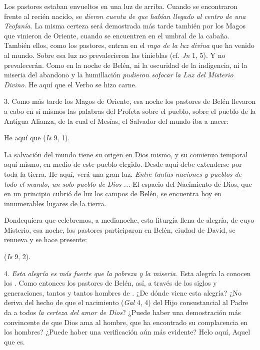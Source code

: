 \begin{body}
\begin{body}
		Los pastores estaban envueltos en una luz de arriba. Cuando se encontraron frente al recién nacido, se \emph{dieron cuenta de que habían llegado al centro de una Teofanía}. La misma certeza será demostrada más tarde también por los Magos que vinieron de Oriente, cuando se encuentren en el umbral de la cabaña. También ellos, como los pastores, entran en el \emph{rayo de la luz divina} que ha venido al mundo. Sobre esa luz no prevalecieron las tinieblas (cf. \emph{Jn} 1, 5). Y no prevalecerán. Como en la noche de Belén, ni la oscuridad de la indigencia, ni la miseria del abandono y la humillación \emph{pudieron sofocar la Luz del Misterio Divino}. He aquí que el Verbo se hizo carne.
		
		3. Como más tarde los Magos de Oriente, esa noche los pastores de Belén llevaron a cabo en sí mismos las palabras del Profeta sobre el pueblo, sobre el pueblo de la Antigua Alianza, de la cual el Mesías, el Salvador del mundo iba a nacer:
		
		He aquí que  (\emph{Is} 9, 1).
		
		La salvación del mundo tiene su origen en Dios mismo, y su comienzo temporal aquí mismo, en medio de este pueblo elegido. Desde aquí debe extenderse por toda la tierra. He aquí,  verá una gran luz. \emph{Entre tantas naciones y pueblos de todo el mundo, un solo pueblo de Dios ...} El espacio del Nacimiento de Dios, que en un principio cubrió de luz los campos de Belén, se encuentra hoy en innumerables lugares de la tierra.
		
		Dondequiera que celebremos, a medianoche, esta liturgia llena de alegría, de cuyo Misterio, esa noche, los pastores participaron en Belén, ciudad de David, se renueva y se hace presente:
		
		 (\emph{Is} 9, 2).
		
		4. \emph{Esta alegría es más fuerte que la pobreza y la miseria.} Esta alegría la conocen los . Como entonces los pastores de Belén, así, a través de los siglos y generaciones, tantos y tantos hombres de . ¿De dónde viene esta alegría? ¿No deriva del hecho de que el nacimiento  (\emph{Gal} 4, 4) del Hijo consustancial al Padre da a todos \emph{la certeza del amor de Dios}? ¿Puede haber una demostración más convincente de que Dios ama al hombre, que ha encontrado su complacencia en los hombres? ¿Puede haber una verificación aún más evidente? Helo aquí, Aquel que es.
		

\end{body}
\end{body}
